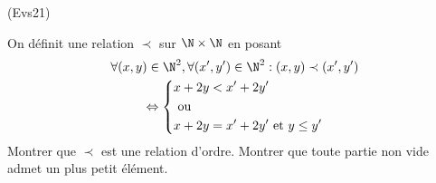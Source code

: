 \begin{tiny}(Evs21)\end{tiny} On définit une relation $\prec$ sur $\N\times \N$ en posant
\begin{multline*}
 \forall (x,y)\in \N^2, \forall (x',y')\in \N^2:
(x,y)\prec (x',y')\\
\Leftrightarrow
\left\lbrace 
\begin{aligned}
& x+2y < x'+2y'\\
&\text{ ou }\\
&x+2y = x'+2y' \text{ et } y\leq y'
\end{aligned}
\right. 
\end{multline*}
Montrer que $\prec$ est une relation d'ordre. Montrer que toute partie non vide admet un plus petit élément.